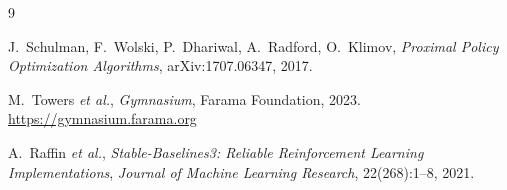 \documentclass[12pt]{article}
\begin{document}

\begin{thebibliography}{9}

    J.\ Schulman, F.\ Wolski, P.\ Dhariwal, A.\ Radford, O.\ Klimov,
    \textit{Proximal Policy Optimization Algorithms},
    arXiv:1707.06347, 2017.

    M.\ Towers \textit{et al.},
    \textit{Gymnasium},
    Farama Foundation, 2023.
    \url{https://gymnasium.farama.org}

    A.\ Raffin \textit{et al.},
    \textit{Stable-Baselines3: Reliable Reinforcement Learning Implementations},
    \textit{Journal of Machine Learning Research}, 22(268):1--8, 2021.

\end{thebibliography}
\end{document}
